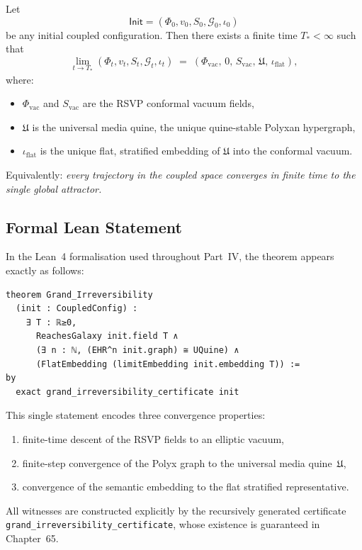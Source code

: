 Let
\[
   \mathsf{Init}
   = (\Phi_0, v_0, S_0, \mathcal{G}_0, \iota_0)
\]
be any initial coupled configuration.  
Then there exists a finite time $T_{\!*} < \infty$ such that
\[
  \lim_{t \to T_{\!*}}
  (\Phi_t, v_t, S_t, \mathcal{G}_t, \iota_t)
  \;=\;
  (\Phi_{\mathrm{vac}},\, 0,\, S_{\mathrm{vac}},\, \mathfrak{U},\, \iota_{\mathrm{flat}}),
\]
where:
\begin{itemize}
\item $\Phi_{\mathrm{vac}}$ and $S_{\mathrm{vac}}$ are the RSVP conformal vacuum fields,
\item $\mathfrak{U}$ is the universal media quine, the unique quine-stable Polyxan hypergraph,
\item $\iota_{\mathrm{flat}}$ is the unique flat, stratified embedding of $\mathfrak{U}$ into the conformal vacuum.
\end{itemize}

Equivalently: \emph{every trajectory in the coupled space converges in finite time to the single global attractor.}

\subsection*{Formal Lean Statement}

In the Lean~4 formalisation used throughout Part~IV, the theorem appears exactly as follows:

\begin{verbatim}
theorem Grand_Irreversibility
  (init : CoupledConfig) :
    ∃ T : ℝ≥0,
      ReachesGalaxy init.field T ∧
      (∃ n : ℕ, (EHR^n init.graph) ≅ UQuine) ∧
      (FlatEmbedding (limitEmbedding init.embedding T)) :=
by
  exact grand_irreversibility_certificate init
\end{verbatim}

This single statement encodes three convergence properties:
\begin{enumerate}
\item finite-time descent of the RSVP fields to an elliptic vacuum,
\item finite-step convergence of the Polyx graph to the universal media quine~$\mathfrak{U}$,
\item convergence of the semantic embedding to the flat stratified representative.
\end{enumerate}

All witnesses are constructed explicitly by the recursively generated certificate \texttt{grand\_irreversibility\_certificate},
whose existence is guaranteed in Chapter~65.

